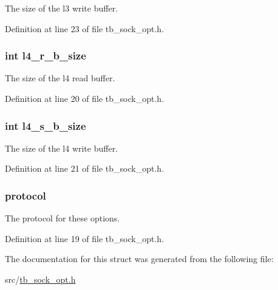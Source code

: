 The size of the l3 write buffer. 



Definition at line 23 of file tb\-\_\-sock\-\_\-opt.\-h.

\hypertarget{structtb__options__t_a8ae9ae9a85fbb77bc460b0d43e4fc1c5}{
\subsubsection[{l4\-\_\-r\-\_\-b\-\_\-size}]{\setlength{\rightskip}{0pt plus 5cm}int l4\-\_\-r\-\_\-b\-\_\-size}}\label{structtb__options__t_a8ae9ae9a85fbb77bc460b0d43e4fc1c5}


The size of the l4 read buffer. 



Definition at line 20 of file tb\-\_\-sock\-\_\-opt.\-h.

\hypertarget{structtb__options__t_a6268133bba17dfd731065a164705d0c7}{
\subsubsection[{l4\-\_\-s\-\_\-b\-\_\-size}]{\setlength{\rightskip}{0pt plus 5cm}int l4\-\_\-s\-\_\-b\-\_\-size}}\label{structtb__options__t_a6268133bba17dfd731065a164705d0c7}


The size of the l4 write buffer. 



Definition at line 21 of file tb\-\_\-sock\-\_\-opt.\-h.

\hypertarget{structtb__options__t_a0d2276cd987e688180eedab183cd503e}{
\subsubsection[{protocol}]{ protocol}}\label{structtb__options__t_a0d2276cd987e688180eedab183cd503e}


The protocol for these options. 



Definition at line 19 of file tb\-\_\-sock\-\_\-opt.\-h.



The documentation for this struct was generated from the following file\-:\begin{DoxyCompactItemize}
\item 
src/\hyperlink{tb__sock__opt_8h}{tb\-\_\-sock\-\_\-opt.\-h}\end{DoxyCompactItemize}
